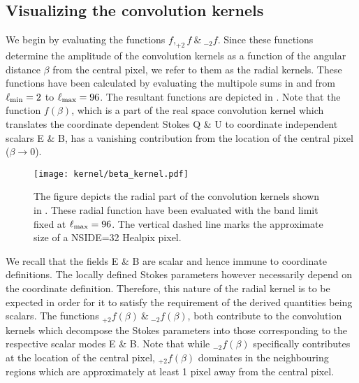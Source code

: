 
 
\subsection{Visualizing the convolution kernels} \label{sec:visualize_operator}
We begin by evaluating the functions $f, _{+2}f ~\&~ _{-2}f $. Since these functions determine the amplitude of the convolution kernels as a function of the angular distance $\beta$ from the central pixel, we refer to them as the radial kernels. These functions have been calculated by evaluating the multipole sums in  and  from $\ell_{\rm min}=2$ to $\ell_{\rm max}=96$. The resultant functions are depicted in . Note that the function $f(\beta)$, which is a part of the  real space convolution  kernel which translates the coordinate dependent Stokes Q \& U to coordinate independent scalars E \& B, has a vanishing contribution from the location of the central pixel ($\beta \rightarrow 0$). 
%
\begin{figure}[!hbt]
\centering
\texttt{[image: kernel/beta\_kernel.pdf]}
\caption{The figure depicts the radial part of the convolution kernels shown in . These radial function have been evaluated with the band limit fixed at $\ell_{\rm max}=96$. The vertical dashed line marks the approximate size of a NSIDE=32 Healpix pixel. }
\label{fig:beta_kernel}
\end{figure}
%
We recall that the fields E \& B are scalar and hence immune to coordinate definitions. The locally defined Stokes parameters however necessarily depend on the coordinate definition. Therefore, this nature of the radial kernel is to be expected in order for it to satisfy the requirement of the derived quantities being scalars. The functions $_{+2}f(\beta)~\&~_{-2}f(\beta)$, both contribute to the convolution kernels which decompose the Stokes parameters into those corresponding to the respective scalar modes E \& B. Note that while $_{-2}f(\beta)$ specifically contributes at the location of the central pixel, $_{+2}f(\beta)$ dominates in the neighbouring regions which are approximately at least 1 pixel away from the central pixel.

